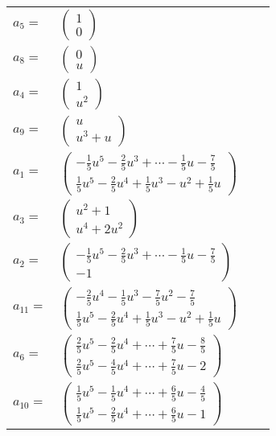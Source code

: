 \documentclass[1p]{elsarticle_modified}
\theoremstyle{definition}
\begin{document}
\begin{tabular}{m{7pt} m{180pt} m{7pt} m{180pt} }
\flushright $a_{5}=$&$\begin{pmatrix}1\\0\end{pmatrix}$ \\
\flushright $a_{8}=$&$\begin{pmatrix}0\\u\end{pmatrix}$ \\
\flushright $a_{4}=$&$\begin{pmatrix}1\\u^2\end{pmatrix}$ \\
\flushright $a_{9}=$&$\begin{pmatrix}u\\u^3+u\end{pmatrix}$ \\
\flushright $a_{1}=$&$\begin{pmatrix}-\frac{1}{5} u^5-\frac{2}{5} u^3+\cdots-\frac{1}{5} u-\frac{7}{5}\\\frac{1}{5} u^5-\frac{2}{5} u^4+\frac{1}{5} u^3- u^2+\frac{1}{5} u\end{pmatrix}$ \\
\flushright $a_{3}=$&$\begin{pmatrix}u^2+1\\u^4+2 u^2\end{pmatrix}$ \\
\flushright $a_{2}=$&$\begin{pmatrix}-\frac{1}{5} u^5-\frac{2}{5} u^3+\cdots-\frac{1}{5} u-\frac{7}{5}\\-1\end{pmatrix}$ \\
\flushright $a_{11}=$&$\begin{pmatrix}-\frac{2}{5} u^4-\frac{1}{5} u^3-\frac{7}{5} u^2-\frac{7}{5}\\\frac{1}{5} u^5-\frac{2}{5} u^4+\frac{1}{5} u^3- u^2+\frac{1}{5} u\end{pmatrix}$ \\
\flushright $a_{6}=$&$\begin{pmatrix}\frac{2}{5} u^5-\frac{2}{5} u^4+\cdots+\frac{7}{5} u-\frac{8}{5}\\\frac{2}{5} u^5-\frac{4}{5} u^4+\cdots+\frac{7}{5} u-2\end{pmatrix}$ \\
\flushright $a_{10}=$&$\begin{pmatrix}\frac{1}{5} u^5-\frac{1}{5} u^4+\cdots+\frac{6}{5} u-\frac{4}{5}\\\frac{1}{5} u^5-\frac{2}{5} u^4+\cdots+\frac{6}{5} u-1\end{pmatrix}$ \\

\end{tabular}
\end{document}
